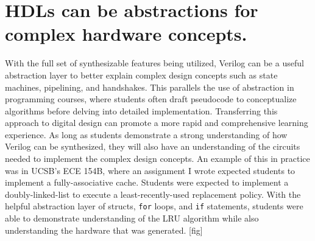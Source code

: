 \section{HDLs can be abstractions for complex hardware concepts.}

With the full set of synthesizable features being utilized, Verilog can be a useful abstraction layer to better explain complex design concepts such as state machines, pipelining, and handshakes. This parallels the use of abstraction in programming courses, where students often draft pseudocode to conceptualize algorithms before delving into detailed implementation. Transferring this approach to digital design can promote a more rapid and comprehensive learning experience. As long as students demonstrate a strong understanding of how Verilog can be synthesized, they will also have an understanding of the circuits needed to implement the complex design concepts. An example of this in practice was in UCSB's ECE 154B, where an assignment I wrote expected students to implement a fully-associative cache. Students were expected to implement a doubly-linked-list to execute a least-recently-used replacement policy. With the helpful abstraction layer of structs, \texttt{for} loops, and \texttt{if} statements, students were able to demonstrate understanding of the LRU algorithm while also understanding the hardware that was generated. [fig]
